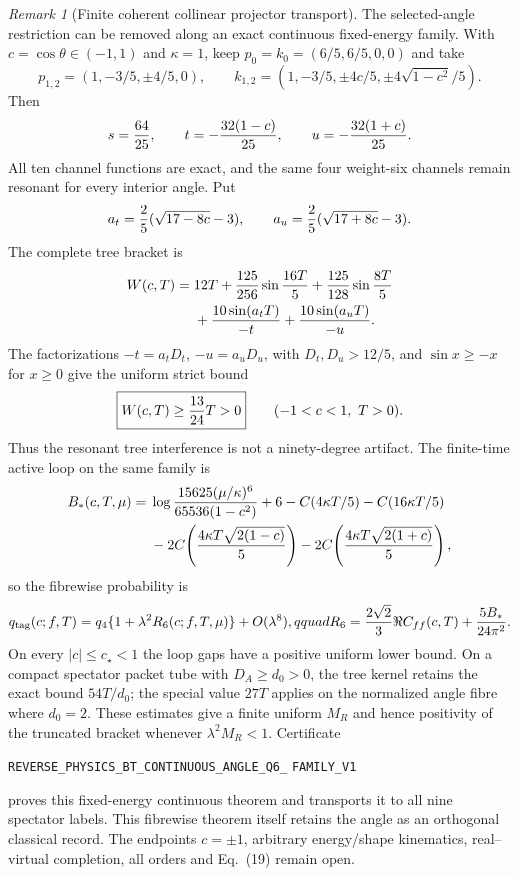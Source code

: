 \documentclass[11pt]{article}
\theoremstyle{definition}
\theoremstyle{remark}
\newtheorem{remark}[theorem]{Remark}
\begin{document}
\begin{remark}[Finite coherent collinear projector transport]
The selected-angle restriction can be removed along an exact continuous
fixed-energy family.  With $c=\cos\theta\in(-1,1)$ and $\kappa=1$, keep
$p_0=k_0=(6/5,6/5,0,0)$ and take
\[
 p_{1,2}=(1,-3/5,\mathord\pm4/5,0),\qquad
 k_{1,2}=(1,-3/5,\mathord\pm4c/5,
                  \mathord\pm4\sqrt{1-c^2}/5).
\]
Then
\[
 s={64\over25},\qquad t=-{32(1-c)\over25},\qquad
 u=-{32(1+c)\over25}.
\]
All ten channel functions are exact, and the same four weight-six channels
remain resonant for every interior angle.  Put
\[
 a_t={2\over5}(\sqrt{17-8c}-3),\qquad
 a_u={2\over5}(\sqrt{17+8c}-3).
\]
The complete tree bracket is
\[
 \begin{split}
 W(c,T)={}&12T+{125\over256}\sin{16T\over5}
 +{125\over128}\sin{8T\over5}\\
 &+{10\sin(a_tT)\over-t}+{10\sin(a_uT)\over-u}.
 \end{split}
\]
The factorizations $-t=a_tD_t$, $-u=a_uD_u$, with
$D_t,D_u>12/5$, and $\sin x\geq-x$ for $x\geq0$ give the uniform strict
bound
\[
 \boxed{W(c,T)\geq {13\over24}T>0}
 \qquad(-1<c<1,\ T>0).
\]
Thus the resonant tree interference is not a ninety-degree artifact.  The
finite-time active loop on the same family is
\[
 \begin{split}
 B_*(c,T,\mu)={}&
 \log {15625(\mu/\kappa)^6\over65536(1-c^2)}+6
 -C(4\kappa T/5)-C(16\kappa T/5)\\
 &-2C\!\left({4\kappa T\sqrt{2(1-c)}\over5}\right)
 -2C\!\left({4\kappa T\sqrt{2(1+c)}\over5}\right),
 \end{split}
\]
so the fibrewise probability is
\[
 q_{\rm tag}(c;f,T)=q_4\{1+\lambda^2R_6(c;f,T,\mu)\}
 +O(\lambda^8),qquad
 R_6={2\sqrt2\over3}\Re C_{ff}(c,T)+{5B_*\over24\pi^2}.
\]
On every $|c|\leq c_\star<1$ the loop gaps have a positive uniform lower
bound.  On a compact spectator packet tube with $D_A\geq d_0>0$, the tree
kernel retains the exact bound $54T/d_0$; the special value $27T$ applies on
the normalized angle fibre where $d_0=2$.  These estimates give a finite
uniform $M_R$ and hence positivity of the truncated bracket whenever
$\lambda^2M_R<1$.  Certificate
\par\noindent
\texttt{REVERSE\_PHYSICS\_BT\_CONTINUOUS\_ANGLE\_Q6\_}
\allowbreak\texttt{FAMILY\_V1}
\par\noindent
proves this fixed-energy continuous theorem and transports it to all nine
spectator labels.  This fibrewise theorem itself retains the angle as an
orthogonal classical record.  The endpoints $c=\mathord\pm1$, arbitrary
energy/shape kinematics, real--virtual completion, all orders and Eq.~(19)
remain open.


\end{remark}
\end{document}

